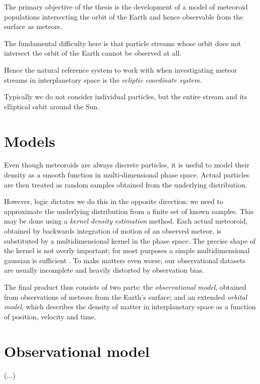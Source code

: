 The primary objective of the thesis is the development of a model of meteoroid populations
intersecting the orbit of the Earth and hence observable from the surface as meteors.





The fundamental difficulty here is that particle streams whose orbit does not intersect the orbit of the Earth
cannot be observed at all.

Hence the natural reference system to work with when investigating meteor streams in interplanetary space
is the \emph{ecliptic coordinate system}.



Typically we do not consider individual particles, but the entire stream and its elliptical orbit around the Sun.

\section{Models}
    Even though meteoroids are always discrete particles, it is useful to model their density
    as a smooth function in multi-dimensional phase space.
    Actual particles are then treated as random samples obtained from the underlying distribution.

    However, logic dictates we do this in the opposite direction: we need to approximate
    the underlying distribution from a finite set of known samples.
    This may be done using a \emph{kernel density estimation} method.
    Each actual meteoroid, obtained by backwards integration of motion of an observed meteor,
    is substituted by a multidimensional kernel in the phase space. The precise shape of the kernel
    is not overly important; for most purposes a simple multidimensional gaussian is sufficient \cite{???}.
    To make matters even worse, our observational datasets are usually incomplete
    and heavily distorted by observation bias.

    The final product thus consists of two parts: the \emph{observational model},
    obtained from observations of meteors from the Earth's surface;
    and an extended \emph{orbital model}, which describes the density of matter
    in interplanetary space as a function of position, velocity and time.

\section{Observational model} \label{io}
    (...)

